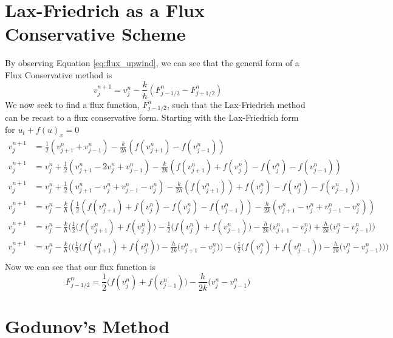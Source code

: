 \section{Lax-Friedrich as a Flux Conservative Scheme}
By observing Equation \ref{eq:flux_upwind}, we can see that the general form of a Flux Conservative method is
\begin{equation}\label{eq:gen_flux}
  v^{n+1}_j = v^n_j - \frac{k}{h}(F^n_{j-1/2} - F^n_{j+1/2})
\end{equation}
We now seek to find a flux function, $F^n_{j-1/2}$, such that the Lax-Friedrich method can be recast to a flux conservative form. Starting with the Lax-Friedrich form for $u_t + f(u)_x = 0$
\begin{align*}
  v^{n+1}_j &= \frac{1}{2}(v^n_{j+1} + v^n_{j-1}) - \frac{k}{2h}(f(v^n_{j+1})-f(v^n_{j-1})) \\
  v^{n+1}_j &= v^n_j + \frac{1}{2}(v^n_{j+1} - 2v^n_j + v^n_{j-1}) - \frac{k}{2h}(f(v^n_{j+1}) +f(v^n_j) -f(v^n_j) -f(v^n_{j-1})) \\
  v^{n+1}_j &= v^n_j + \frac{1}{2}(v^n_{j+1} - v^n_j + v^n_{j-1} - v^n_j) - \frac{k}{2h}(f(v^n_{j+1})) +f(v^n_j) -f(v^n_j) -f(v^n_{j-1})) \\
  v^{n+1}_j &= v^n_j - \frac{k}{h}(\frac{1}{2}(f(v^n_{j+1}) +f(v^n_j) -f(v^n_j) -f(v^n_{j-1})) - \frac{h}{2k}(v^n_{j+1} - v^n_j + v^n_{j-1} - v^n_j)) \\
  v^{n+1}_j &= v^n_j - \frac{k}{h}\Bigg(\frac{1}{2}\big(f(v^n_{j+1}) +f(v^n_j)\big) - \frac{1}{2}\big(f(v^n_j) +f(v^n_{j-1})\big) - \frac{h}{2k}\big(v^n_{j+1} - v^n_j\big) +  \frac{h}{2k}\big(v^n_j - v^n_{j-1}\big)\Bigg) \\
  v^{n+1}_j &= v^n_j - \frac{k}{h}\Bigg(\bigg(\frac{1}{2}\big(f(v^n_{j+1}) +f(v^n_j)\big)- \frac{h}{2k}\big(v^n_{j+1} - v^n_j\big)\bigg) - \bigg(\frac{1}{2}\big(f(v^n_j) +f(v^n_{j-1})\big)  -  \frac{h}{2k}\big(v^n_j - v^n_{j-1}\big) \bigg) \Bigg) \\
\end{align*}
Now we can see that our flux function is
\begin{equation}
  F^n_{j-1/2} = \frac{1}{2}\big(f(v^n_j) +f(v^n_{j-1})\big)  -  \frac{h}{2k}\big(v^n_j - v^n_{j-1}\big)
\end{equation}
\section{Godunov's Method} 